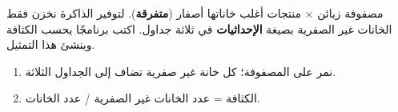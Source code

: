 \begin{statement}
مصفوفة زبائن × منتجات أغلب خاناتها أصفار (\textbf{متفرقة}). لتوفير الذاكرة نخزن فقط الخانات غير الصفرية بصيغة \textbf{الإحداثيات}  في ثلاثة جداول. اكتب برنامجًا يحسب الكثافة وينشئ هذا التمثيل.
\end{statement}
\begin{stepsbox}\begin{enumerate}
\item نمر على المصفوفة؛ كل خانة غير صفرية تضاف إلى الجداول الثلاثة.
\item الكثافة = عدد الخانات غير الصفرية / عدد الخانات.
\end{enumerate}\end{stepsbox}
